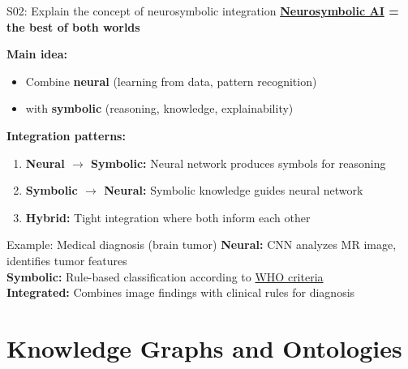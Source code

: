 \documentclass[aspectratio=169, 10pt]{beamer}
\begin{document}
\begin{frame}{S02: Explain the concept of neurosymbolic integration}
    \textbf{\href{https://en.wikipedia.org/wiki/Neuro-symbolic_AI}{Neurosymbolic AI} = the best of both worlds}
    
    \vspace{0.2cm}
    \textbf{Main idea:}
    \begin{itemize}
        \item Combine \textbf{neural} (learning from data, pattern recognition)
        \item with \textbf{symbolic} (reasoning, knowledge, explainability)
    \end{itemize}
    
    \vspace{0.2cm}
    \textbf{Integration patterns:}
    \begin{enumerate}
        \item \textbf{Neural $\rightarrow$ Symbolic:} Neural network produces symbols for reasoning
        \item \textbf{Symbolic $\rightarrow$ Neural:} Symbolic knowledge guides neural network
        \item \textbf{Hybrid:} Tight integration where both inform each other
    \end{enumerate}
    
    \vspace{0.2cm}
    {\small
    \begin{block}{Example: Medical diagnosis (brain tumor)}
        \textbf{Neural:} CNN analyzes MR image, identifies tumor features \\
        \textbf{Symbolic:} Rule-based classification according to \href{https://publications.iarc.who.int/Book-And-Report-Series/Who-Classification-Of-Tumours/Central-Nervous-System-Tumours-2021}{WHO criteria} \\
        \textbf{Integrated:} Combines image findings with clinical rules for diagnosis
    \end{block}
    }
\end{frame}

\section{Knowledge Graphs and Ontologies}
\end{document}
